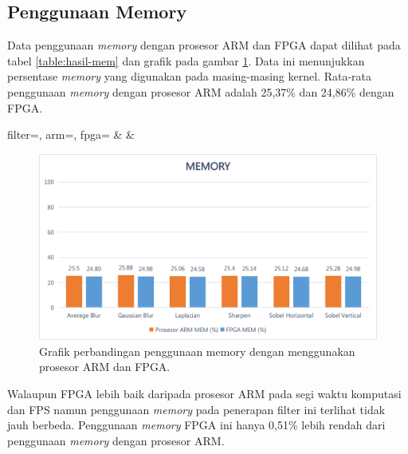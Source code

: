 \subsection{Penggunaan Memory}
Data penggunaan \textit{memory} dengan prosesor ARM dan FPGA dapat dilihat pada tabel \ref{table:hasil-mem} dan grafik pada gambar \ref{fig:chart-mem}. Data ini menunjukkan persentase \textit{memory} yang digunakan pada masing-masing kernel. Rata-rata penggunaan \textit{memory} dengan prosesor ARM adalah 25,37\% dan 24,86\% dengan FPGA. 
\begin{atable}
    \caption{Tabel perbandingan penggunaan memory dengan menggunakan prosesor ARM dan FPGA.}
    \label{table:hasil-mem}
        {
            filter=\filter, 
            arm=\arm, 
            fpga=\fpga}
        {
            \filter & 
            \arm & 
            \fpga }
\end{atable}

\begin{figure}[H]
    \includegraphics[width=0.81\linewidth, center]{images/chart/chart-mem.png}
    \caption{Grafik perbandingan penggunaan memory dengan menggunakan prosesor ARM dan FPGA.}
    \label{fig:chart-mem}
\end{figure}
Walaupun FPGA lebih baik daripada prosesor ARM pada segi waktu komputasi dan FPS namun penggunaan \textit{memory} pada penerapan filter ini terlihat tidak jauh berbeda. Penggunaan \textit{memory} FPGA ini hanya 0,51\% lebih rendah dari penggunaan \textit{memory} dengan prosesor ARM.

